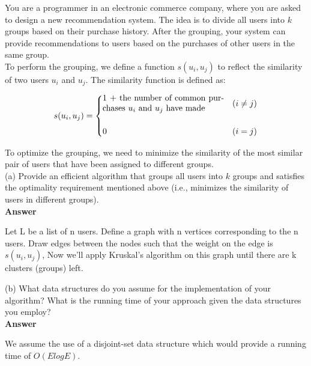 \documentclass{article}
\begin{document}
 You are a programmer in an
electronic commerce company, where you are asked to design a new
recommendation system. The idea is to divide all users into $k$ groups
based on their purchase history. After the grouping, your system can
provide recommendations to users based on the purchases of other users
in the same group.\\

\noindent To perform the grouping, we define a function $s(u_i, u_j)$
to reflect the similarity of two users $u_i$ and $u_j$. The similarity
function is defined as: \vspace{-0.05in}

$$
s(u_i, u_j) = \begin{cases}
  \parbox{2in}{1 + the number of common purchases $u_i$ and $u_j$ have made} & 
  (i \neq j) \\
    \\
  0 & (i = j)
\end{cases}
$$

\noindent To optimize the grouping, we need to minimize the similarity
of the most similar pair of users that have been assigned to different
groups.\\

\noindent (a) Provide an efficient algorithm that groups all users
into $k$ groups and satisfies the optimality requirement mentioned
above (i.e., minimizes the similarity of users in different groups).\\

\textbf{ Answer }
\vspace{0.1in}
\begin{adjustwidth}{1.8em}{0pt}
Let L be a list of n users. Define a graph with n vertices corresponding to the n users. Draw edges between the nodes such that the weight on the edge is $s(u_{i},u_{j})$, Now we'll apply Kruskal's algorithm on this graph until there are k clusters (groups) left.
\end{adjustwidth}
\vspace{0.1in}

\noindent (b) What data structures do you assume for the
implementation of your algorithm?  What is the running time of your
approach given the data structures you employ?\\

\textbf{ Answer }
\vspace{0.1in}
\begin{adjustwidth}{1.8em}{0pt}
We assume the use of a disjoint-set data structure which would provide a running time of $O(ElogE)$.
\end{adjustwidth}
\vspace{0.1in}
\end{document}
